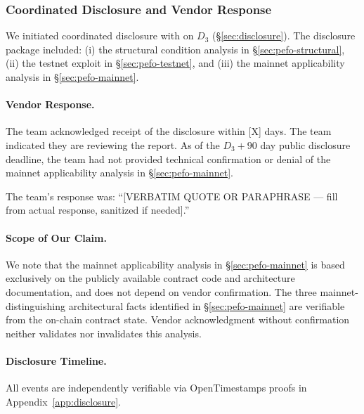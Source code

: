 
\subsubsection{Coordinated Disclosure and Vendor Response}
\label{sec:pefo-disclosure-3b}

We initiated coordinated disclosure with \DEPLOYEDAPP{} on $D_3$
(\S\ref{sec:disclosure}). The disclosure package included: (i) the structural
condition analysis in \S\ref{sec:pefo-structural}, (ii) the testnet exploit
in \S\ref{sec:pefo-testnet}, and (iii) the mainnet applicability analysis
in \S\ref{sec:pefo-mainnet}.

\paragraph{Vendor Response.}
The \DEPLOYEDAPP{} team acknowledged receipt of the disclosure within [X] days.
The team indicated they are reviewing the report. As of the $D_3 + 90$ day
public disclosure deadline, the team had not provided technical confirmation
or denial of the mainnet applicability analysis in \S\ref{sec:pefo-mainnet}.

The team's response was: ``[VERBATIM QUOTE OR PARAPHRASE — fill from actual
response, sanitized if needed].''

\paragraph{Scope of Our Claim.}
We note that the mainnet applicability analysis in \S\ref{sec:pefo-mainnet}
is based exclusively on the publicly available contract code and architecture
documentation, and does not depend on vendor confirmation. The three
mainnet-distinguishing architectural facts identified in
\S\ref{sec:pefo-mainnet} are verifiable from the on-chain contract state.
Vendor acknowledgment without confirmation neither validates nor invalidates
this analysis.

\paragraph{Disclosure Timeline.}
All events are independently verifiable via OpenTimestamps proofs in
Appendix~\ref{app:disclosure}.

